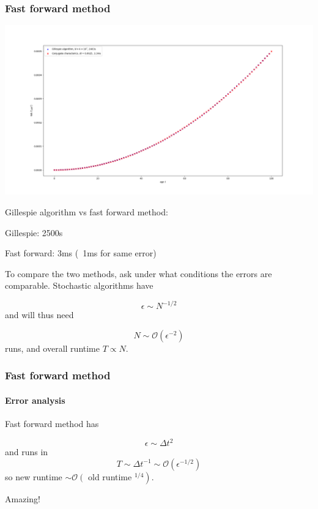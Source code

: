 \documentclass{beamer}
\begin{document}
\begin{frame}
    \frametitle{Fast forward method}

    \includegraphics[width=\textwidth]{figures/Figure_1.png}


    Gillespie algorithm vs fast forward method:

    Gillespie: 2500s

    Fast forward: 3ms (~1ms for same error)
\end{frame}


\begin{frame}

    To compare the two methods, ask under what conditions the errors are
    comparable. Stochastic algorithms have 

    \begin{equation}
        \epsilon \sim N^{-1/2}
    \end{equation}
    and will thus need
    
    \begin{equation}
        N \sim \mathcal{O}(\epsilon^{-2})
    \end{equation}
    runs, and overall runtime $T \propto N$.

\end{frame}

\begin{frame}
    \frametitle{Fast forward method}
    \framesubtitle{Error analysis}
    Fast forward method has

    \begin{equation}
        \epsilon \sim \Delta t^2
    \end{equation}
    and runs in 
    \begin{equation}
        T \sim \Delta t^{-1} \sim \mathcal{O}(\epsilon^{-1/2})
    \end{equation}
    so new runtime $\sim \mathcal{O}\left(\right.$ old runtime
    $\left.^{1/4}\right)$.

    \;

    Amazing!
\end{frame}
\end{document}
